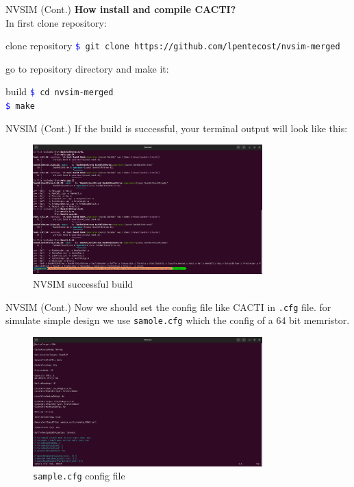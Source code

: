 \documentclass{beamer}
\begin{document}
\begin{frame}{NVSIM (Cont.)}
	\textbf{How install and compile CACTI?}\\
	
	In first clone repository: 
	\begin{block}{clone repository}
		\texttt{\textcolor{blue}{\$} git clone https://github.com/lpentecost/nvsim-merged} \\
	\end{block}
	go to repository directory and make it: 
	\begin{block}{build}
		\texttt{\textcolor{blue}{\$} cd nvsim-merged} \\
			\texttt{\textcolor{blue}{\$} make} \\
	\end{block}
\end{frame}



\begin{frame}{NVSIM (Cont.)}
	If the build is successful, your terminal output will look like this:
	
	\begin{figure}
		\centering
		\includegraphics[height=5cm]{images/img6}
		\caption{NVSIM successful build}
		\label{fig:NVSIM successful build}
	\end{figure}
\end{frame}





\begin{frame}{NVSIM (Cont.)}
	Now we should set the config file like CACTI in \texttt{.cfg} file. for simulate simple design we use \texttt{samole.cfg} which the config of a 64 bit memristor.
	
	\begin{figure}
		\centering
		\includegraphics[height=5cm]{images/img7}
		\caption{\texttt{sample.cfg} config file}
		\label{fig:sample.cfg config file1}
	\end{figure}
\end{frame}
\end{document}
